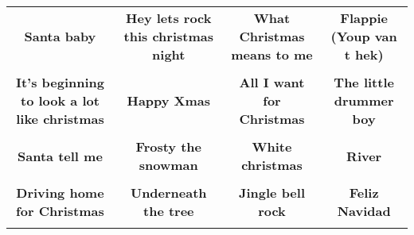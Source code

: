 \documentclass[12pt]{article} \usepackage{eso-pic, graphicx}
\newcommand{\background}[1]{%
\AddToShipoutPictureBG*{\texttt{[image: \#1]}}
}
\begin{document}
\tabcolsep=30.2pt \renewcommand{\arraystretch}{4.5}   \vspace*{4.3cm} \begin{center}  \begin{tabular}{c c c c}
\parbox{3cm}{\centering \textbf{Santa baby}}& 
\parbox{3cm}{\centering \textbf{Hey lets rock this christmas night}}& 
\parbox{3cm}{\centering \textbf{What Christmas means to me}}& 
\parbox{3cm}{\centering \textbf{Flappie (Youp van t hek)}}\\ \\ 
\parbox{3cm}{\centering \textbf{It’s beginning to look a lot like christmas}}& 
\parbox{3cm}{\centering \textbf{Happy Xmas}}& 
\parbox{3cm}{\centering \textbf{All I want for Christmas}}& 
\parbox{3cm}{\centering \textbf{The little drummer boy}}\\ \\ 
\parbox{3cm}{\centering \textbf{Santa tell me}}& 
\parbox{3cm}{\centering \textbf{Frosty the snowman}}& 
\parbox{3cm}{\centering \textbf{White christmas}}& 
\parbox{3cm}{\centering \textbf{River}}\\ \\ 
\parbox{3cm}{\centering \textbf{Driving home for Christmas}}& 
\parbox{3cm}{\centering \textbf{Underneath the tree}}& 
\parbox{3cm}{\centering \textbf{Jingle bell rock}}& 
\parbox{3cm}{\centering \textbf{Feliz Navidad}}\\ \\ 
\end{tabular} \background{discobingo.pdf} \end{center} 
\end{document}
